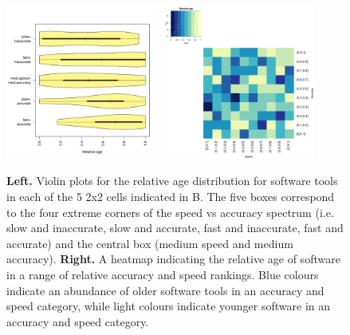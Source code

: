 \documentclass[fleqn,10pt]{SelfArx} %
\begin{document}
\begin{figure}[H]
\centering
\includegraphics[width=0.45\textwidth]{relAge-speedAcc.pdf}
\includegraphics[width=0.45\textwidth]{relAge-SpeedVsAccuracy-heatmap.pdf}
\caption{{\bf Left.} Violin plots for the relative age distribution
  for software tools in each of the 5 2x2 cells indicated in B. The
  five boxes correspond to the four extreme corners of the speed vs
  accuracy spectrum (i.e. slow and inaccurate, slow and accurate, fast
  and inaccurate, fast and accurate) and the central box (medium speed
  and medium accuracy). {\bf Right.} A heatmap indicating the relative age
  of software in a range of relative accuracy and speed rankings. Blue
  colours indicate an abundance of older software tools in an accuracy
  and speed category, while light colours indicate younger software in
  an accuracy and speed category. }
\label{fig:ageplot}
\end{figure}




\end{document}
